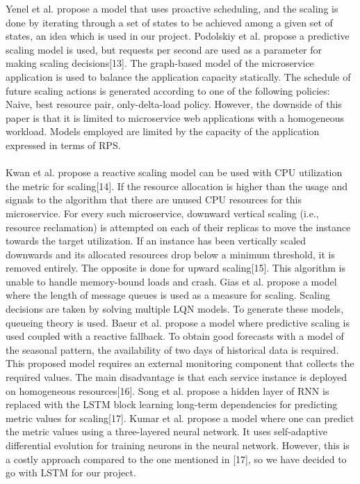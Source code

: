 \documentclass[conference]{IEEEtran}
\begin{document}
Yenel et al. propose a model that uses proactive scheduling, and the scaling is done by iterating through a set of states to be achieved among a given set of states, an idea which is used in our project. Podolskiy et al. propose a predictive scaling model is used, but requests per second are used as a parameter for making scaling decisions[13]. The graph-based model of the microservice application is used to balance the application capacity statically. The schedule of future scaling actions is generated according to one of the following policies: Naive, best resource pair, only-delta-load policy. However, the downside of this paper is that it is limited to microservice web applications with a homogeneous workload. Models employed are limited by the capacity of the application expressed in terms of RPS. \\ \\

Kwan et al. propose a reactive scaling model can be used with CPU utilization the metric for scaling[14]. If the resource allocation is higher than the usage and signals to the algorithm that there are unused CPU resources for this microservice. For every such microservice, downward vertical scaling (i.e., resource reclamation) is attempted on each of their replicas to move the instance towards the target utilization. If an instance has been vertically scaled downwards and its allocated resources drop below a minimum threshold, it is removed entirely. The opposite is done for upward scaling[15]. This algorithm is unable to handle memory-bound loads and crash. Gias et al. propose a model where the length of message queues is used as a measure for scaling. Scaling decisions are taken by solving multiple LQN models. To generate these models, queueing theory is used. Baeur et al. propose a model where predictive scaling is used coupled with a reactive fallback. To obtain good forecasts with a model of the seasonal pattern, the availability of two days of historical data is required. This proposed model requires an external monitoring component that collects the required values. The main disadvantage is that each service instance is deployed on homogeneous resources[16]. Song et al. propose a hidden layer of RNN is replaced with the LSTM block learning long-term dependencies for predicting metric values for scaling[17]. Kumar et al. propose a model where one can predict the metric values using a three-layered neural network. It uses self-adaptive differential evolution for training neurons in the neural network. However, this is a costly approach compared to the one mentioned in [17], so we have decided to go with LSTM for our project. \\ \\
\end{document}
